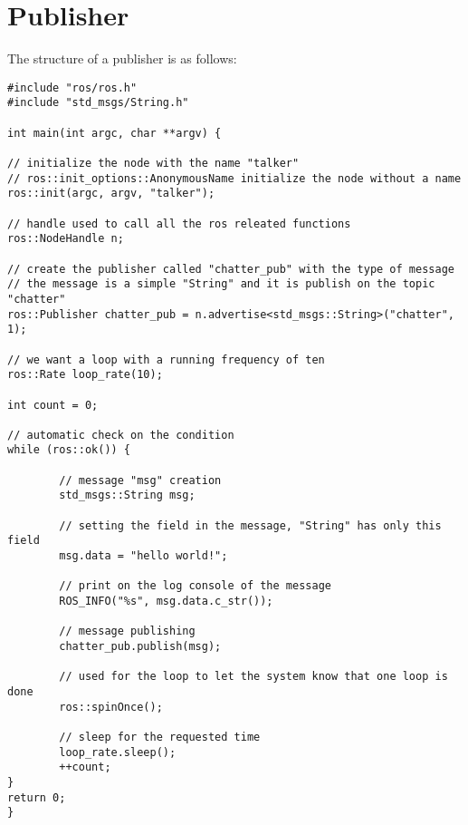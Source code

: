 \section{Publisher}

The structure of a publisher is as follows: 
\begin{verbatim}
#include "ros/ros.h"
#include "std_msgs/String.h"

int main(int argc, char **argv) {

// initialize the node with the name "talker"
// ros::init_options::AnonymousName initialize the node without a name 
ros::init(argc, argv, "talker"); 

// handle used to call all the ros releated functions
ros::NodeHandle n;

// create the publisher called "chatter_pub" with the type of message
// the message is a simple "String" and it is publish on the topic "chatter"
ros::Publisher chatter_pub = n.advertise<std_msgs::String>("chatter", 1);

// we want a loop with a running frequency of ten
ros::Rate loop_rate(10);

int count = 0;

// automatic check on the condition
while (ros::ok()) {

        // message "msg" creation
        std_msgs::String msg;
            
        // setting the field in the message, "String" has only this field
        msg.data = "hello world!";

        // print on the log console of the message
        ROS_INFO("%s", msg.data.c_str());

        // message publishing
        chatter_pub.publish(msg);

        // used for the loop to let the system know that one loop is done
        ros::spinOnce();

        // sleep for the requested time
        loop_rate.sleep();
        ++count;
}
return 0;
}
\end{verbatim}